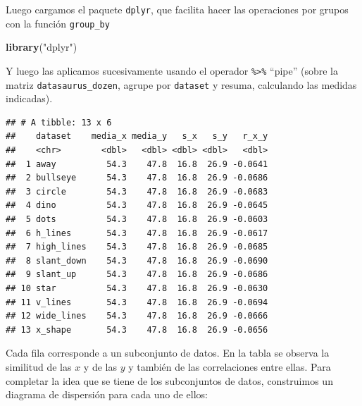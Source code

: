 \documentclass[]{book}
\newenvironment{Shaded}{\begin{snugshade}}{\end{snugshade}}
\newcommand{\DataTypeTok}[1]{\textcolor[rgb]{0.13,0.29,0.53}{#1}}
\newcommand{\KeywordTok}[1]{\textcolor[rgb]{0.13,0.29,0.53}{\textbf{#1}}}
\newcommand{\NormalTok}[1]{#1}
\newcommand{\OperatorTok}[1]{\textcolor[rgb]{0.81,0.36,0.00}{\textbf{#1}}}
\newcommand{\StringTok}[1]{\textcolor[rgb]{0.31,0.60,0.02}{#1}}
\begin{document}
Luego cargamos el paquete \texttt{dplyr}, que facilita hacer las operaciones por grupos con la función \texttt{group\_by}

\begin{Shaded}
\begin{Highlighting}[]
\KeywordTok{library}\NormalTok{(}\StringTok{"dplyr"}\NormalTok{)}
\end{Highlighting}
\end{Shaded}

Y luego las aplicamos sucesivamente usando el operador \texttt{\%\textgreater{}\%} ``pipe'' (sobre la matriz \texttt{datasaurus\_dozen}, agrupe por \texttt{dataset} y resuma, calculando las medidas indicadas).

\begin{Shaded}
\end{Shaded}

\begin{verbatim}
## # A tibble: 13 x 6
##    dataset    media_x media_y   s_x   s_y   r_x_y
##    <chr>        <dbl>   <dbl> <dbl> <dbl>   <dbl>
##  1 away          54.3    47.8  16.8  26.9 -0.0641
##  2 bullseye      54.3    47.8  16.8  26.9 -0.0686
##  3 circle        54.3    47.8  16.8  26.9 -0.0683
##  4 dino          54.3    47.8  16.8  26.9 -0.0645
##  5 dots          54.3    47.8  16.8  26.9 -0.0603
##  6 h_lines       54.3    47.8  16.8  26.9 -0.0617
##  7 high_lines    54.3    47.8  16.8  26.9 -0.0685
##  8 slant_down    54.3    47.8  16.8  26.9 -0.0690
##  9 slant_up      54.3    47.8  16.8  26.9 -0.0686
## 10 star          54.3    47.8  16.8  26.9 -0.0630
## 11 v_lines       54.3    47.8  16.8  26.9 -0.0694
## 12 wide_lines    54.3    47.8  16.8  26.9 -0.0666
## 13 x_shape       54.3    47.8  16.8  26.9 -0.0656
\end{verbatim}

Cada fila corresponde a un subconjunto de datos. En la tabla se observa la similitud de las \(x\) y de las \(y\) y también de las correlaciones entre ellas. Para completar la idea que se tiene de los subconjuntos de datos, construimos un diagrama de dispersión para cada uno de ellos:
\end{document}
